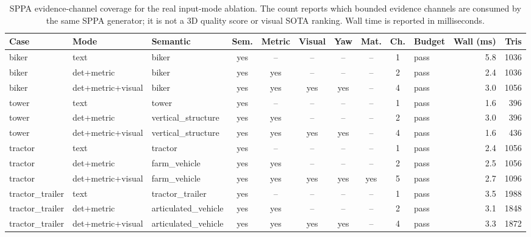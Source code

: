 \begin{table}[H]
\centering
\scriptsize
\setlength{\tabcolsep}{3pt}
\renewcommand{\arraystretch}{1.05}
\caption{SPPA evidence-channel coverage for the real input-mode ablation. The count reports which bounded evidence channels are consumed by the same SPPA generator; it is not a 3D quality score or visual SOTA ranking. Wall time is reported in milliseconds.}
\label{tab:sppa-evidence-channel-coverage}
\begin{tabular}{@{}lllcccccclrr@{}}
\toprule
Case & Mode & Semantic & Sem. & Metric & Visual & Yaw & Mat. & Ch. & Budget & Wall (ms) & Tris \\
\midrule
biker & text & biker & yes & -- & -- & -- & -- & 1 & pass & 5.8 & 1036 \\
biker & det+metric & biker & yes & yes & -- & -- & -- & 2 & pass & 2.4 & 1036 \\
biker & det+metric+visual & biker & yes & yes & yes & yes & -- & 4 & pass & 3.0 & 1056 \\
tower & text & tower & yes & -- & -- & -- & -- & 1 & pass & 1.6 & 396 \\
tower & det+metric & vertical\_structure & yes & yes & -- & -- & -- & 2 & pass & 3.0 & 396 \\
tower & det+metric+visual & vertical\_structure & yes & yes & yes & yes & -- & 4 & pass & 1.6 & 436 \\
tractor & text & tractor & yes & -- & -- & -- & -- & 1 & pass & 2.4 & 1056 \\
tractor & det+metric & farm\_vehicle & yes & yes & -- & -- & -- & 2 & pass & 2.5 & 1056 \\
tractor & det+metric+visual & farm\_vehicle & yes & yes & yes & yes & yes & 5 & pass & 2.7 & 1096 \\
tractor\_trailer & text & tractor\_trailer & yes & -- & -- & -- & -- & 1 & pass & 3.5 & 1988 \\
tractor\_trailer & det+metric & articulated\_vehicle & yes & yes & -- & -- & -- & 2 & pass & 3.1 & 1848 \\
tractor\_trailer & det+metric+visual & articulated\_vehicle & yes & yes & yes & yes & -- & 4 & pass & 3.3 & 1872 \\
\bottomrule
\end{tabular}
\end{table}

